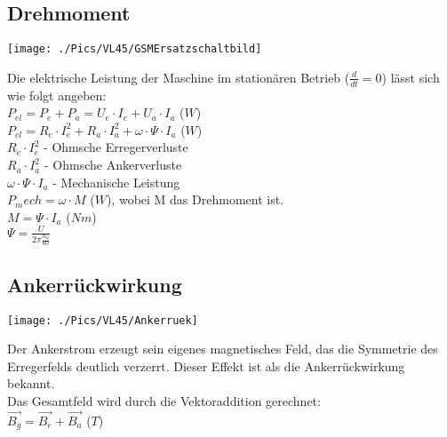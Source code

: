 \subsection{Drehmoment}
\begin{minipage}{0.4 \linewidth}
\texttt{[image: ./Pics/VL45/GSMErsatzschaltbild]}
\end{minipage}
\begin{minipage}{0.6 \linewidth}
Die elektrische Leistung der Maschine im stationären Betrieb ($\frac{d}{dt} = 0$) lässt sich wie folgt angeben: \\

$P_{el} = P_e + P_a = U_e \cdot I_e + U_a \cdot I_a$ ($W$) \\

$P_{el} = R_e \cdot I_e^2 + R_a \cdot I_a^2 + \omega \cdot \Psi \cdot I_a$ ($W$) \\

$R_e \cdot I_e^2$  - Ohmsche Erregerverluste \\

$R_a \cdot I_a^2$  - Ohmsche Ankerverluste \\

$\omega \cdot \Psi \cdot I_a$ -  Mechanische Leistung \\

$P_mech = \omega \cdot M$ ($W$), wobei M das Drehmoment ist. \\

$M = \Psi \cdot I_a$ ($Nm$) \\

$\Psi = \frac{U}{2 \pi \frac{n_0}{60}} $ 
\end{minipage}

\subsection{Ankerrückwirkung}
\begin{minipage}{0.4 \linewidth}
\texttt{[image: ./Pics/VL45/Ankerruek]}
\end{minipage}
\begin{minipage}{0.6 \linewidth}
Der Ankerstrom erzeugt sein eigenes magnetisches Feld, das die Symmetrie des Erregerfelds deutlich verzerrt. Dieser Effekt ist als die Ankerrückwirkung bekannt. \\

Das Gesamtfeld wird durch die Vektoraddition gerechnet: \\

$\vec{B_g} = \vec{B_e} + \vec{B_a}$ ($T$)
\end{minipage}

